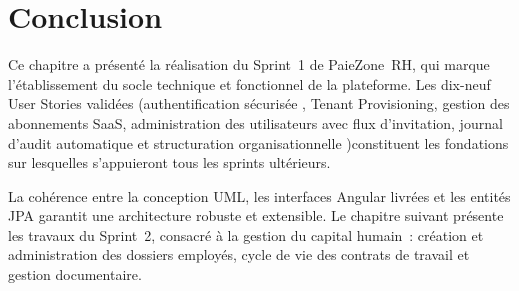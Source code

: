\section*{Conclusion}
\label{sec:s1-conclusion}
Ce chapitre a présenté la réalisation du Sprint~1 de PaieZone~RH,
qui marque l'établissement du socle technique et fonctionnel de la
  plateforme. Les dix-neuf User Stories validées (authentification
  sécurisée , Tenant Provisioning, gestion des abonnements
  SaaS, administration des utilisateurs avec flux d'invitation, journal
  d'audit automatique et structuration organisationnelle )constituent
  les fondations sur lesquelles s'appuieront tous les sprints ultérieurs.

  La cohérence entre la conception UML, les interfaces Angular livrées
  et les entités JPA garantit
  une architecture robuste et extensible. Le chapitre suivant présente
  les travaux du Sprint~2, consacré à la gestion du capital humain~:
  création et administration des dossiers employés, cycle de vie des
  contrats de travail et gestion documentaire.
